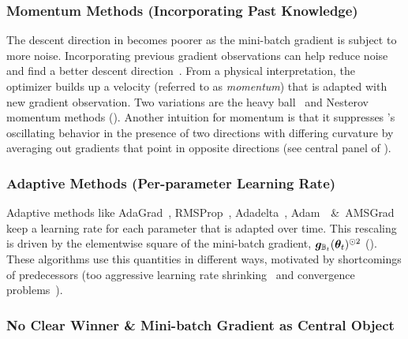 \subsubsection{Momentum Methods (Incorporating Past Knowledge)}

The descent direction in \sgd becomes poorer as the mini-batch gradient is
subject to more noise. Incorporating previous gradient observations can help
reduce noise and find a better descent direction~\cite[][Chapter
8.3]{goodfellow2016deep}. From a physical interpretation, the optimizer builds
up a velocity (referred to as \emph{momentum}) that is adapted with new gradient
observation. Two variations are the heavy ball~\cite{polyak1964some} and
Nesterov~\cite{nesterov1983method} momentum methods
(). Another intuition for
momentum is that it suppresses \sgd's oscillating behavior in the presence of
two directions with differing curvature by averaging out gradients that point in
opposite directions (see \eg central panel of ).

\subsubsection{Adaptive Methods (Per-parameter Learning Rate)}

Adaptive methods like AdaGrad~\cite{duchi2011adaptive},
RMSProp~\cite{tieleman2012lecture}, Adadelta~\cite{zeiler2012adadelta},
Adam~\cite{kingma2015adam}~\&~AMSGrad~\cite{reddi2018on} keep a learning rate
for each parameter that is adapted over time. This rescaling is driven by the
elementwise square of the mini-batch gradient, ${\bm{g}}_{{\mathbb{B}}_t}({\bm{\theta}}_t)^{\odot
  2}$
().
These algorithms use this quantities in different ways, motivated by
shortcomings of predecessors (\eg too aggressive learning rate
shrinking~\cite{tieleman2012lecture,zeiler2012adadelta} and convergence
problems~\cite{reddi2018on}).

\subsubsection{No Clear Winner \& Mini-batch Gradient as Central Object}

